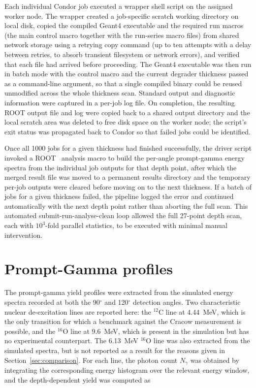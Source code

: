 \documentclass[a4paper]{article}
\begin{document}
Each individual Condor job executed a wrapper shell script on the assigned worker node. The wrapper created a job-specific scratch working directory on local disk, copied the compiled Geant4 executable and the required run macros (the main control macro together with the run-series macro files) from shared network storage using a retrying copy command (up to ten attempts with a delay between retries, to absorb transient filesystem or network errors), and verified that each file had arrived before proceeding. The Geant4 executable was then run in batch mode with the control macro and the current degrader thickness passed as a command-line argument, so that a single compiled binary could be reused unmodified across the whole thickness scan. Standard output and diagnostic information were captured in a per-job log file. On completion, the resulting ROOT output file and log were copied back to a shared output directory and the local scratch area was deleted to free disk space on the worker node; the script's exit status was propagated back to Condor so that failed jobs could be identified.

Once all 1000 jobs for a given thickness had finished successfully, the driver script invoked a ROOT~\cite{root} analysis macro to build the per-angle prompt-gamma energy spectra from the individual job outputs for that depth point, after which the merged result file was moved to a permanent results directory and the temporary per-job outputs were cleared before moving on to the next thickness. If a batch of jobs for a given thickness failed, the pipeline logged the error and continued automatically with the next depth point rather than aborting the full scan. This automated submit-run-analyse-clean loop allowed the full 27-point depth scan, each with $10^3$-fold parallel statistics, to be executed with minimal manual intervention.

\section{Prompt-Gamma profiles}

The prompt-gamma yield profiles were extracted from the simulated energy spectra recorded at both the 90$^\circ$ and 120$^\circ$ detection angles. Two characteristic nuclear de-excitation lines are reported here: the $^{12}$C line at 4.44~MeV, which is the only transition for which a benchmark against the Cracow measurement is possible, and the $^{16}$O line at 9.6~MeV, which is present in the simulation but has no experimental counterpart. The 6.13~MeV $^{16}$O line was also extracted from the simulated spectra, but is not reported as a result for the reasons given in Section~\ref{sec:comparison}. For each line, the photon count $N_\gamma$ was obtained by integrating the corresponding energy histogram over the relevant energy window, and the depth-dependent yield was computed as
\end{document}
